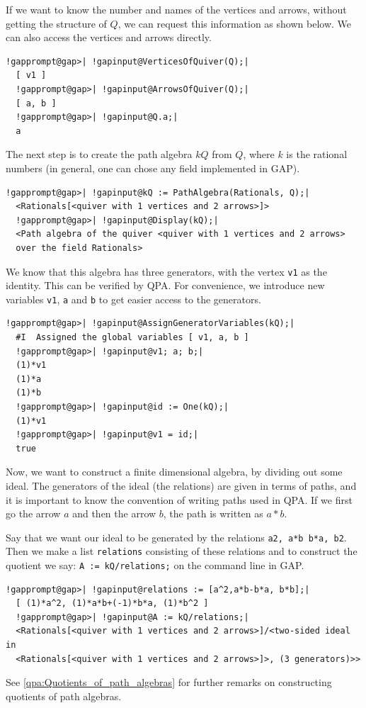 \documentclass[a4paper,11pt]{report}
\begin{document}
{{ If we want to know the number and names of the vertices and arrows, without
getting the structure of $Q$, we can request this information as shown below. We can also access the
vertices and arrows directly. 
\begin{Verbatim}[commandchars=!@|,fontsize=\small,frame=single,label=Example]
  !gapprompt@gap>| !gapinput@VerticesOfQuiver(Q);|
  [ v1 ]
  !gapprompt@gap>| !gapinput@ArrowsOfQuiver(Q);|
  [ a, b ]
  !gapprompt@gap>| !gapinput@Q.a;|
  a
\end{Verbatim}
 The next step is to create the path algebra $kQ$ from $Q$, where $k$ is the rational numbers (in general, one can chose any field implemented in \textsf{GAP}). 
\begin{Verbatim}[commandchars=!@|,fontsize=\small,frame=single,label=Example]
  !gapprompt@gap>| !gapinput@kQ := PathAlgebra(Rationals, Q);|
  <Rationals[<quiver with 1 vertices and 2 arrows>]>
  !gapprompt@gap>| !gapinput@Display(kQ);|
  <Path algebra of the quiver <quiver with 1 vertices and 2 arrows> 
  over the field Rationals>
\end{Verbatim}
 We know that this algebra has three generators, with the vertex \texttt{v{\textunderscore}1} as the identity. This can be verified by \textsf{QPA}. For convenience, we introduce new variables \texttt{v1}, \texttt{a} and \texttt{b} to get easier access to the generators. 
\begin{Verbatim}[commandchars=!@|,fontsize=\small,frame=single,label=Example]
  !gapprompt@gap>| !gapinput@AssignGeneratorVariables(kQ);|
  #I  Assigned the global variables [ v1, a, b ]
  !gapprompt@gap>| !gapinput@v1; a; b;|
  (1)*v1
  (1)*a
  (1)*b
  !gapprompt@gap>| !gapinput@id := One(kQ);|
  (1)*v1
  !gapprompt@gap>| !gapinput@v1 = id;|
  true
\end{Verbatim}
 Now, we want to construct a finite dimensional algebra, by dividing out some
ideal. The generators of the ideal (the relations) are given in terms of
paths, and it is important to know the convention of writing paths used in \textsf{QPA}. If we first go the arrow $a$ and then the arrow $b$, the path is written as $a*b$. 

 Say that we want our ideal to be generated by the relations \texttt{\texttt{}\texttt{}a\texttt{}2, a*b
\texttt{} b*a,
b\texttt{}2\texttt{}\texttt{}}. Then we make a list \texttt{relations} consisting of these relations and to construct the quotient we say: \texttt{A := kQ/relations;} on the command line in \textsf{GAP}. 
\begin{Verbatim}[commandchars=!@|,fontsize=\small,frame=single,label=Example]
  !gapprompt@gap>| !gapinput@relations := [a^2,a*b-b*a, b*b];|
  [ (1)*a^2, (1)*a*b+(-1)*b*a, (1)*b^2 ]
  !gapprompt@gap>| !gapinput@A := kQ/relations;|
  <Rationals[<quiver with 1 vertices and 2 arrows>]/<two-sided ideal in 
  <Rationals[<quiver with 1 vertices and 2 arrows>]>, (3 generators)>>
\end{Verbatim}
 See \ref{qpa:Quotients_of_path_algebras} for further remarks on constructing quotients of path algebras. }

}
\end{document}
